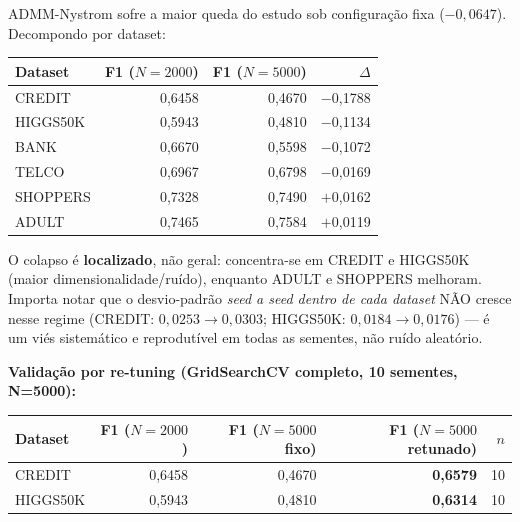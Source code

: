 \documentclass[12pt,a4paper]{article}
\begin{document}
\begin{tcolorbox}[colback=warnbg, colframe=warnborder, fonttitle=\bfseries,
  title=\textbf{Achado 3 --- ADMM-Nystrom: hiperparâmetros $\ell_1$ fixos não
  transferem uniformemente entre escalas (mas o modelo não colapsa
  estruturalmente --- validado por re-tuning)}]
ADMM-Nystrom sofre a maior queda do estudo sob configuração fixa
($-0{,}0647$). Decompondo por dataset:

\begin{center}
\begin{tabular}{lrrr}
\toprule
\textbf{Dataset} & \textbf{F1 ($N{=}2000$)} & \textbf{F1 ($N{=}5000$)} & \textbf{$\Delta$} \\
\midrule
CREDIT   & 0,6458 & 0,4670 & $-$0,1788 \\
HIGGS50K & 0,5943 & 0,4810 & $-$0,1134 \\
BANK     & 0,6670 & 0,5598 & $-$0,1072 \\
TELCO    & 0,6967 & 0,6798 & $-$0,0169 \\
SHOPPERS & 0,7328 & 0,7490 & $+$0,0162 \\
ADULT    & 0,7465 & 0,7584 & $+$0,0119 \\
\bottomrule
\end{tabular}
\end{center}

O colapso é \textbf{localizado}, não geral: concentra-se em CREDIT e
HIGGS50K (maior dimensionalidade/ruído), enquanto ADULT e SHOPPERS melhoram.
Importa notar que o desvio-padrão \emph{seed a seed dentro de cada dataset}
NÃO cresce nesse regime (CREDIT: $0{,}0253\to0{,}0303$; HIGGS50K:
$0{,}0184\to0{,}0176$) --- é um viés sistemático e reprodutível em todas as
sementes, não ruído aleatório.

\textbf{Validação por re-tuning (GridSearchCV completo, 10 sementes, N=5000):}

\begin{center}
\begin{tabular}{lrrrr}
\toprule
\textbf{Dataset} & \textbf{F1 ($N{=}2000$)} & \textbf{F1 ($N{=}5000$ fixo)} & \textbf{F1 ($N{=}5000$ retunado)} & $n$ \\
\midrule
CREDIT   & 0,6458 & 0,4670 & \textbf{0,6579} & 10 \\
HIGGS50K & 0,5943 & 0,4810 & \textbf{0,6314} & 10 \\
\bottomrule
\end{tabular}
\end{center}


\end{tcolorbox}
\end{document}
